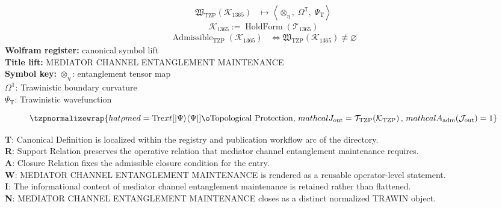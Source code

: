 \noindent
\begin{minipage}[t]{0.48\linewidth}
\begingroup
\small
\[
\begin{aligned}
\mathfrak{W}_{\mathrm{TZP}}\!\left(\mathcal{K}_{1365}\right)
&\longmapsto
\left\langle \otimes_{\eta},\; \Omega^{\mathbb{T}},\; \Psi_{\mathrm{T}} \right\rangle
\end{aligned}
\]
\[
\mathcal{K}_{1365}
:=
\operatorname{HoldForm}\!\left(\mathcal{T}_{1365}\right)
\]
\[
\begin{aligned}
\operatorname{Admissible}_{\mathrm{TZP}}\!\left(\mathcal{K}_{1365}\right)
&\Longleftrightarrow
\mathfrak{W}_{\mathrm{TZP}}\!\left(\mathcal{K}_{1365}\right)\not\equiv\varnothing
\end{aligned}
\]
\textbf{Wolfram register:} canonical symbol lift\\
\textbf{Title lift:} MEDIATOR CHANNEL ENTANGLEMENT MAINTENANCE\\
\textbf{Symbol key:} \(\otimes_{\eta}\): entanglement tensor map\\ \(\Omega^{\mathbb{T}}\): Trawinistic boundary curvature\\ \(\Psi_{\mathrm{T}}\): Trawinistic wavefunction
\par
\endgroup
\end{minipage}\hfill
\begin{minipage}[t]{0.48\linewidth}
\[
\tzpnormalizewrap{hat{\rho} {med} = \text{Tr} {ext}[\lvert \Psi \rangle \langle \Psi|] \o\text{Topological Protection},\,mathcal{J}_{\mathrm{out}} = \mathcal{T}_{\mathrm{TZP}}\!\left(\mathcal{K}_{\mathrm{TZP}}\right),\,mathcal{A}_{\mathrm{adm}}\!\left(\mathcal{J}_{\mathrm{out}}\right)=1}
\]

\small
\textbf{T}: Canonical Definition is localized within the registry and publication workflow arc of the directory.\\
\textbf{R}: Support Relation preserves the operative relation that mediator channel entanglement maintenance requires.\\
\textbf{A}: Closure Relation fixes the admissible closure condition for the entry.\\
\textbf{W}: MEDIATOR CHANNEL ENTANGLEMENT MAINTENANCE is rendered as a reusable operator-level statement.\\
\textbf{I}: The informational content of mediator channel entanglement maintenance is retained rather than flattened.\\
\textbf{N}: MEDIATOR CHANNEL ENTANGLEMENT MAINTENANCE closes as a distinct normalized TRAWIN object.
\normalsize
\end{minipage}

